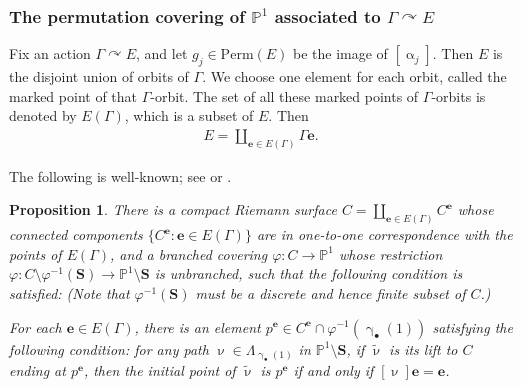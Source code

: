 \documentclass[12pt,a4paper,notitlepage]{article}
\theoremstyle{definition}
\theoremstyle{plain}
\newtheorem{pp}[df]{Proposition}
\newcommand{\wtd}{\widetilde}
\newcommand{\mbf}{\mathbf}
\newcommand{\blt}{\bullet}
\newcommand{\Pbb}{\mathbb P}
\newcommand{\Sbf}{\mathbf{S}}
\newcommand{\Perm}{\mathrm{Perm}}
\numberwithin{equation}{subsection}
\begin{document}
\subsubsection{The permutation covering of $\Pbb^1$ associated to $\Gamma\curvearrowright E$}




Fix an action $\Gamma\curvearrowright E$, and let $g_j\in\Perm(E)$ be the image of $[\upalpha_j]$. Then $E$ is the disjoint union of orbits of $\Gamma$. We choose one element for each orbit, called the marked point of that $\Gamma$-orbit. The set of all these marked points of $\Gamma$-orbits is denoted by $E(\Gamma)$,  which is a subset of $E$. Then
\begin{align*}
E=\coprod_{\mbf e\in E(\Gamma)}\Gamma \mbf e.	
\end{align*}


The following is well-known; see  \cite[Sec. 4.2.2, Thm. 2]{Don} or \cite[Sec. 19b]{Ful}.


\begin{pp}\label{lb3}
There is a compact Riemann surface $C=\coprod_{\mbf e\in E(\Gamma)}C^{\mbf e}$ whose connected components $\{C^{\mbf e}:\mbf e\in E(\Gamma)\}$ are in one-to-one correspondence with the points of $E(\Gamma)$, and a branched covering $\varphi:C\rightarrow\Pbb^1$ whose restriction $\varphi:C\setminus\varphi^{-1}(\Sbf)\rightarrow\Pbb^1\setminus\Sbf$ is unbranched,  such that the following condition is satisfied: (Note that $\varphi^{-1}(\Sbf)$ must be a discrete and hence finite subset of $C$.) 

For each $\mbf e\in E(\Gamma)$, there is an element $p^{\mbf e}\in C^{\mbf e}\cap\varphi^{-1}(\upgamma_\blt(1))$ satisfying the following condition: for any path $\upnu\in\Lambda_{\upgamma_\blt(1)}$ in $\Pbb^1\setminus\Sbf$, if $\wtd\upnu$ is its lift to $C$ ending at $p^{\mbf e}$, then the initial point of $\wtd\upnu$ is $p^{\mbf e}$ if and only if $[\upnu]\mbf e=\mbf e$.
\end{pp}
\end{document}
